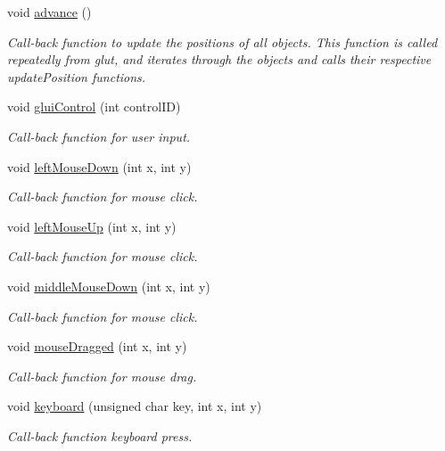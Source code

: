 \begin{DoxyCompactItemize}
void \hyperlink{classSimulation_a4938ccecec0e9356cf547ef7bd5bbdf8}{advance} ()
\begin{DoxyCompactList}\small\item\em Call-\/back function to update the positions of all objects.  This function is called repeatedly from glut, and iterates through the objects and calls their respective update\-Position functions. \end{DoxyCompactList}\item 
void \hyperlink{classSimulation_a1607cd18e552ab9f4a6f57d362f7121a}{glui\-Control} (int control\-I\-D)
\begin{DoxyCompactList}\small\item\em Call-\/back function for user input. \end{DoxyCompactList}\item 
void \hyperlink{classSimulation_a786d1ba31d29937f0ac6f3ea88f8a607}{left\-Mouse\-Down} (int x, int y)
\begin{DoxyCompactList}\small\item\em Call-\/back function for mouse click. \end{DoxyCompactList}\item 
void \hyperlink{classSimulation_a62ef254d85017074cd521a5787b5a234}{left\-Mouse\-Up} (int x, int y)
\begin{DoxyCompactList}\small\item\em Call-\/back function for mouse click. \end{DoxyCompactList}\item 
void \hyperlink{classSimulation_a4a8fb0f5c7cff8e747ae11d46653d18b}{middle\-Mouse\-Down} (int x, int y)
\begin{DoxyCompactList}\small\item\em Call-\/back function for mouse click. \end{DoxyCompactList}\item 
void \hyperlink{classSimulation_af942a4554aa7a45b468ea7e5bc2e0c4b}{mouse\-Dragged} (int x, int y)
\begin{DoxyCompactList}\small\item\em Call-\/back function for mouse drag. \end{DoxyCompactList}\item 
void \hyperlink{classSimulation_af2fc2b7caf1b85fb68c82375c3391569}{keyboard} (unsigned char key, int x, int y)
\begin{DoxyCompactList}\small\item\em Call-\/back function keyboard press. \end{DoxyCompactList}\item 

\end{DoxyCompactItemize}
